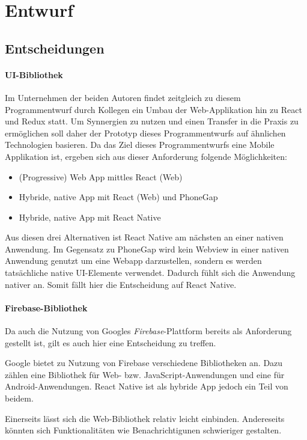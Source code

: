 \section{Entwurf}\label{sec:entwurf}

\subsection{Entscheidungen}
\paragraph{UI-Bibliothek}
Im Unternehmen der beiden Autoren findet zeitgleich zu diesem Programmentwurf durch Kollegen ein Umbau der Web-Applikation hin zu React und Redux statt.
Um Synnergien zu nutzen und einen Transfer in die Praxis zu ermöglichen soll daher der Prototyp dieses Programmentwurfs auf ähnlichen Technologien basieren.
Da das Ziel dieses Programmentwurfs eine Mobile Applikation ist, ergeben sich aus dieser Anforderung folgende Möglichkeiten:
\begin{itemize}
    \item (Progressive) Web App mittles React (Web)
    \item Hybride, native App mit React (Web) und PhoneGap
    \item Hybride, native App mit React Native
\end{itemize}

Aus diesen drei Alternativen ist React Native am nächsten an einer nativen Anwendung.
Im Gegensatz zu PhoneGap wird kein Webview in einer nativen Anwendung genutzt um eine Webapp darzustellen,
sondern es werden tatsächliche native UI-Elemente verwendet.
Dadurch fühlt sich die Anwendung nativer an.
Somit fällt hier die Entscheidung auf React Native.

\paragraph{Firebase-Bibliothek}
Da auch die Nutzung von Googles \textit{Firebase}-Plattform bereits als Anforderung gestellt ist,
gilt es auch hier eine Entscheidung zu treffen.

Google bietet zu Nutzung von Firebase verschiedene Bibliotheken an.
Dazu zählen eine Bibliothek für Web- bzw. JavaScript-Anwendungen und eine für Android-Anwendungen.
React Native ist als hybride App jedoch ein Teil von beidem.

Einerseits lässt sich die Web-Bibliothek relativ leicht einbinden.
Andereseits könnten sich Funktionalitäten wie Benachrichtigunen schwieriger gestalten.

